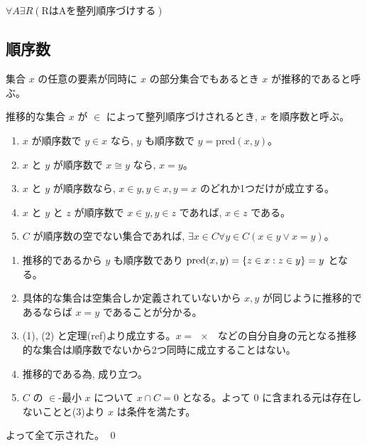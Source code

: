 \documentclass[uplatex,dvipdfmx,a4paper,11pt]{jlreq}
\makeatletter
\theoremstyle{definition}
\renewenvironment{proof}[1][\proofname]{\par
  \normalfont
  \topsep6\p@\@plus6\p@ \trivlist
  \item[\hskip\labelsep{\bfseries #1}\@addpunct{\bfseries}]\ignorespaces\quad\par
}{%
  \qed\endtrivlist\@endpefalse
}
\renewcommand\proofname{証明}
\makeatother
\begin{document}
\begin{axiom}[選択公理]
  $\forall A\exists R(\text{RはAを整列順序づけする})$
\end{axiom}


\subsection{順序数}
\begin{definition}[推移的]
  集合 $x$ の任意の要素が同時に $x$ の部分集合でもあるとき $x$ が推移的であると呼ぶ。
\end{definition}
\begin{definition}[順序数]
  推移的な集合 $x$ が $\in$ によって整列順序づけされるとき, $x$ を順序数と呼ぶ。
\end{definition}

\begin{theorem}
  \begin{enumerate}
    \item $x$ が順序数で $y\in x$ なら, $y$ も順序数で $y=\mathrm{pred}(x,y)$。
    \item $x$ と $y$ が順序数で $x\cong y$ なら, $x=y$。
    \item $x$ と $y$ が順序数なら, $x\in y, y\in x, y=x$ のどれか1つだけが成立する。
    \item $x$ と $y$ と $z$ が順序数で $x\in y, y\in z$ であれば, $x\in z$ である。
    \item $C$ が順序数の空でない集合であれば, $\exists x\in C\forall y\in C(x\in y\lor x=y)$。
  \end{enumerate}
\end{theorem}
\begin{proof}
  \begin{enumerate}
    \item 推移的であるから $y$ も順序数であり $\mathrm{pred}(x,y) = \qty{z\in x:z \in y} = y$ となる。
    \item 具体的な集合は空集合しか定義されていないから $x, y$ が同じように推移的であるならば $x = y$ であることが分かる。
    \item (1), (2) と定理(ref)より成立する。$x=\qty{x}$ などの自分自身の元となる推移的な集合は順序数でないから2つ同時に成立することはない。
    \item 推移的である為, 成り立つ。
    \item $C$ の $\in$-最小 $x$ について $x\cap C = 0$ となる。よって $0$ に含まれる元は存在しないことと(3)より $x$ は条件を満たす。
  \end{enumerate}
  よって全て示された。
\end{proof}
\end{document}
